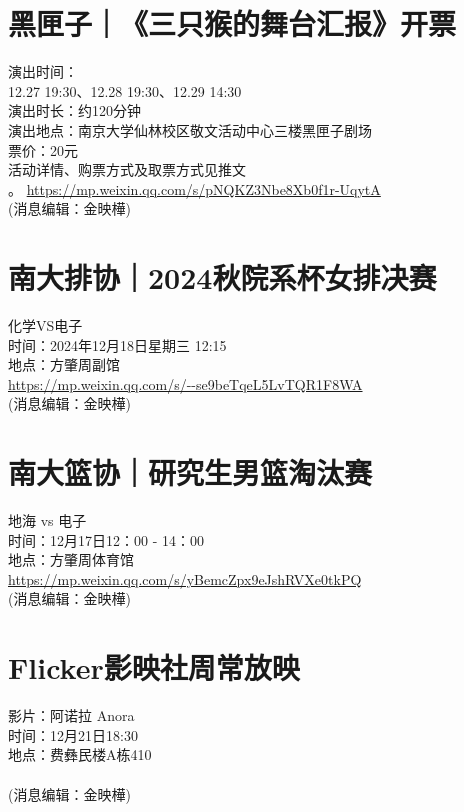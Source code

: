 \documentclass[letterpaper, 12pt]{article}
\begin{document}
\begin{multicols}{2}
\section{黑匣子｜《三只猴的舞台汇报》开票}
演出时间：\\
12.27 19:30、12.28 19:30、12.29 14:30\\
演出时长：约120分钟\\
演出地点：南京大学仙林校区敬文活动中心三楼黑匣子剧场\\
票价：20元\\
活动详情、购票方式及取票方式见推文\\。
\url{https://mp.weixin.qq.com/s/pNQKZ3Nbe8Xb0f1r-UqytA}\\
(消息编辑：金映樺)

\section{南大排协｜2024秋院系杯女排决赛}
化学VS电子\\
时间：2024年12月18日星期三 12:15\\
地点：方肇周副馆\\
\url{https://mp.weixin.qq.com/s/--se9beTqeL5LvTQR1F8WA}\\
(消息编辑：金映樺)

\section{南大篮协｜研究生男篮淘汰赛}
地海 vs 电子\\
时间：12月17日12：00 - 14：00\\
地点：方肇周体育馆\\
\url{https://mp.weixin.qq.com/s/yBemcZpx9eJshRVXe0tkPQ}\\
(消息编辑：金映樺)

\section{Flicker影映社周常放映}
影片：阿诺拉 Anora\\
时间：12月21日18:30\\
地点：费彝民楼A栋410\\\\
(消息编辑：金映樺)

\end{multicols} 
\end{document}
